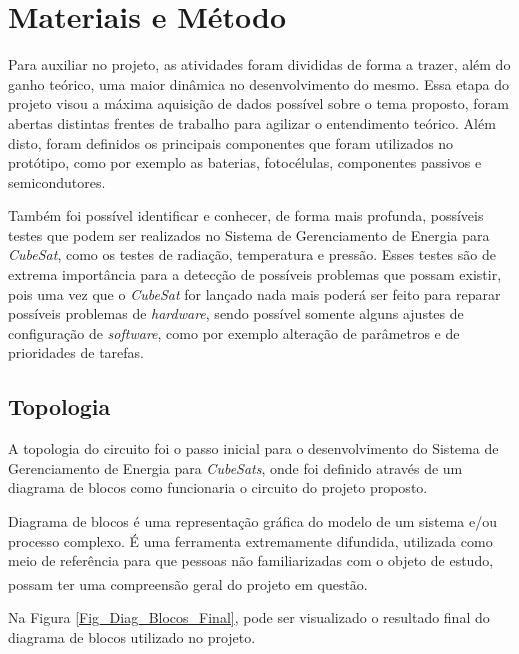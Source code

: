 \documentclass[
	12pt,				%
	openright,			%
	oneside,			%
	a4paper,			%
	english,			%
	french,				%
	spanish,			%
	brazil,				%
	oldfontcommands
	]{abntex2}
\begin{document}
\chapter[Materiais e Método]{Materiais e Método}

	Para auxiliar no projeto, as atividades foram divididas de forma a trazer, além do ganho teórico, uma maior dinâmica no desenvolvimento do mesmo. Essa etapa do projeto visou a máxima aquisição de dados possível sobre o tema proposto, foram abertas distintas frentes de trabalho para agilizar o entendimento teórico. Além disto, foram definidos os principais componentes que foram utilizados no protótipo, como por exemplo as baterias, fotocélulas, componentes passivos e semicondutores.
	
	Também foi possível identificar e conhecer, de forma mais profunda, possíveis testes que podem ser realizados no Sistema de Gerenciamento de Energia para \textit{CubeSat}, como os testes de radiação, temperatura e pressão. Esses testes são de extrema importância para a detecção de possíveis problemas que possam existir, pois uma vez que o \textit{CubeSat} for lançado nada mais poderá ser feito para reparar possíveis problemas de \textit{hardware}, sendo possível somente alguns ajustes de configuração de \textit{software}, como por exemplo alteração de parâmetros e de prioridades de tarefas.
	
\section[Topologia]{Topologia}

	A topologia do circuito foi o passo inicial para o desenvolvimento do Sistema de Gerenciamento de Energia para \textit{CubeSats}, onde foi definido através de um diagrama de blocos como funcionaria o circuito do projeto proposto.
	
	Diagrama de blocos é uma representação gráfica do modelo de um sistema e/ou processo complexo. É uma ferramenta extremamente difundida, utilizada como meio de referência para que pessoas não familiarizadas com o objeto de estudo, possam ter uma compreensão geral do projeto em questão.\textsuperscript{\cite{Diag_Blocos}}	
		
	Na Figura \ref{Fig_Diag_Blocos_Final}, pode ser visualizado o resultado final do diagrama de blocos utilizado no projeto.
	
\end{document}
